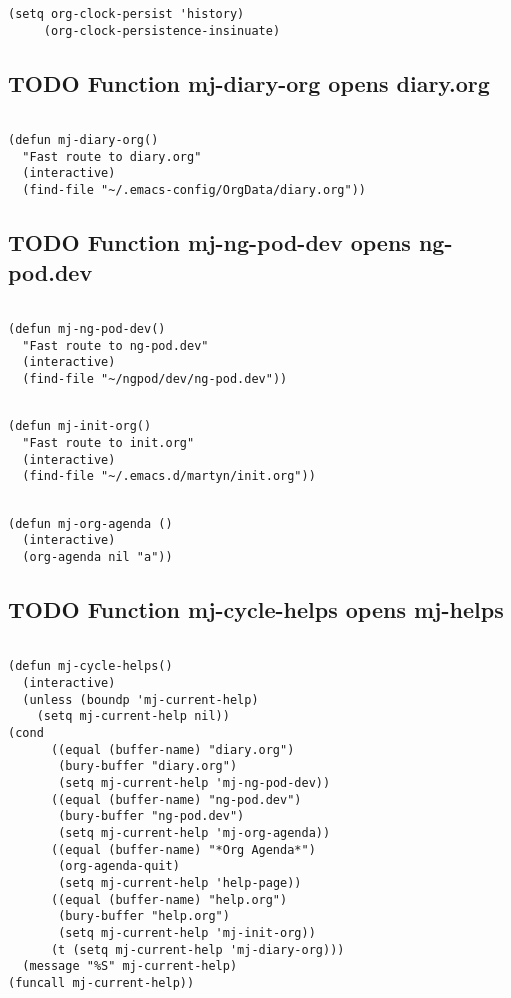 \documentclass[colorlinks=true,urlcolor=blue,listings-sv]{article}
\begin{document}
{{{\begin{lstlisting}
(setq org-clock-persist 'history)
     (org-clock-persistence-insinuate)
\end{lstlisting}
\subsection{\textbf{TODO} Function mj-diary-org opens diary.org}
\label{sec-2-30}



\lstset{language=Lisp}
\begin{lstlisting}

(defun mj-diary-org()
  "Fast route to diary.org"
  (interactive)
  (find-file "~/.emacs-config/OrgData/diary.org"))
\end{lstlisting}
\subsection{\textbf{TODO} Function mj-ng-pod-dev opens ng-pod.dev}
\label{sec-2-31}



\lstset{language=Lisp}
\begin{lstlisting}

(defun mj-ng-pod-dev()
  "Fast route to ng-pod.dev"
  (interactive)
  (find-file "~/ngpod/dev/ng-pod.dev"))
\end{lstlisting}

\lstset{language=Lisp}
\begin{lstlisting}

(defun mj-init-org()
  "Fast route to init.org"
  (interactive)
  (find-file "~/.emacs.d/martyn/init.org"))
\end{lstlisting}


\lstset{language=Lisp}
\begin{lstlisting}

(defun mj-org-agenda ()
  (interactive)
  (org-agenda nil "a"))
\end{lstlisting}
\subsection{\textbf{TODO} Function mj-cycle-helps opens mj-helps}
\label{sec-2-32}



\lstset{language=Lisp}
\begin{lstlisting}

(defun mj-cycle-helps()
  (interactive)
  (unless (boundp 'mj-current-help)
    (setq mj-current-help nil))
(cond 
      ((equal (buffer-name) "diary.org")
       (bury-buffer "diary.org")
       (setq mj-current-help 'mj-ng-pod-dev))
      ((equal (buffer-name) "ng-pod.dev")
       (bury-buffer "ng-pod.dev")
       (setq mj-current-help 'mj-org-agenda))
      ((equal (buffer-name) "*Org Agenda*")
       (org-agenda-quit)
       (setq mj-current-help 'help-page))
      ((equal (buffer-name) "help.org")
       (bury-buffer "help.org")
       (setq mj-current-help 'mj-init-org))
      (t (setq mj-current-help 'mj-diary-org)))
  (message "%S" mj-current-help)
(funcall mj-current-help))
\end{lstlisting}
}}}
\end{document}
